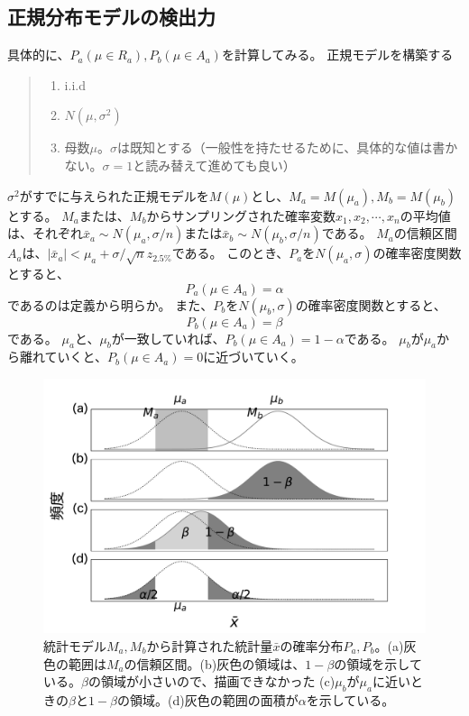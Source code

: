 \subsection{正規分布モデルの検出力}
具体的に、$P_a(\mu \in R_a),P_b(\mu\in A_a)$を計算してみる。
正規モデルを構築する
\begin{quote}
    \begin{enumerate}[(1)]
\item i.i.d
\item $N(\mu,\sigma^2)$
\item 母数$\mu$。$\sigma$は既知とする（一般性を持たせるために、具体的な値は書かない。$\sigma=1$と読み替えて進めても良い）
\end{enumerate}
\end{quote}
\fi
$\sigma^2$がすでに与えられた正規モデルを$M(\mu)$とし、$M_a=M(\mu_a),M_b=M(\mu_b)$とする。
$M_a$または、$M_b$からサンプリングされた確率変数$x_1,x_2,\cdots,x_n$の平均値は、それぞれ$\bar{x}_a\sim N(\mu_a,\sigma/n)$または$\bar{x}_b\sim N(\mu_b,\sigma/n)$である。
$M_a$の信頼区間$A_a$は、$|\bar{x}_a|<\mu_a+\sigma / \sqrt{n}z_{2.5\%}$である。
このとき、$P_a$を$N(\mu_a,\sigma)$の確率密度関数とすると、
\begin{equation*}
    P_a(\mu \in A_a) = \alpha
\end{equation*}
であるのは定義から明らか。
また、$P_b$を$N(\mu_b,\sigma)$の確率密度関数とすると、
\begin{equation*}
    P_b(\mu \in A_a ) = \beta
\end{equation*}
である。
$\mu_a$と、$\mu_b$が一致していれば、$P_b(\mu \in A_a ) = 1-\alpha$である。
$\mu_b$が$\mu_a$から離れていくと、$P_b(\mu \in A_a)=0$に近づいていく。


\begin{figure}
\begin{center}
    \includegraphics[width=15cm]{./image/04_/power_of_a_test_2.pdf}
    \caption{統計モデル$M_a,M_b$から計算された統計量$\bar{x}$の確率分布$P_a,P_b$。(a)灰色の範囲は$M_a$の信頼区間。(b)灰色の領域は、$1-\beta$の領域を示している。$\beta$の領域が小さいので、描画できなかった (c)$\mu_b$が$\mu_a$に近いときの$\beta$と$1-\beta$の領域。(d)灰色の範囲の面積が$\alpha$を示している。}
    \label{fig:power_of_test_alpha_beta}
\end{center}
\end{figure}


